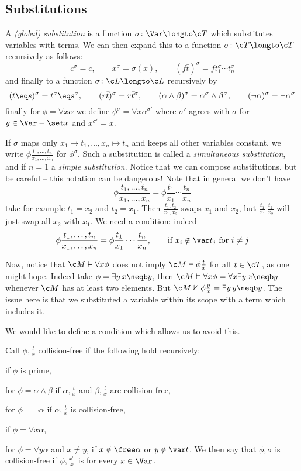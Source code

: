 \subsection{Substitutions}

A {\it (global) substitution} is a function $\sigma\colon\Var\longto\c T$ which substitutes variables with terms.
We can then expand this to a function $\sigma\colon\c T\longto\c T$ recursively as follows:
$$ c^\sigma = c,\qquad x^\sigma = \sigma(x),\qquad (f\bar t)^\sigma = ft_1^\sigma\cdots t_n^\sigma $$
and finally to a function $\sigma\colon\c L\longto\c L$ recursively by
$$ (t\eq s)^\sigma = t^\sigma\eq s^\sigma,\qquad (r\bar t)^\sigma = r\bar t^\sigma,\qquad (\alpha\land\beta)^\sigma = \alpha^\sigma\land\beta^\sigma,\qquad (\neg\alpha)^\sigma=\neg\alpha^\sigma $$
finally for $\phi=\forall x\alpha$ we define $\phi^\sigma=\forall x\alpha^{\sigma'}$ where $\sigma'$ agrees with $\sigma$ for $y\in\Var-\set x$ and $x^{\sigma'}=x$.


If $\sigma$ maps only $x_1\mapsto t_1,\dots,x_n\mapsto t_n$ and keeps all other variables constant, we write $\phi\frac{t_1,\dots,t_n}{x_1,\dots,x_n}$ for $\phi^\sigma$.
Such a substitution is called a {\it simultaneous substitution}, and if $n=1$ a {\it simple substitution}.
Notice that we can compose substitutions, but be careful -- this notation can be dangerous!
Note that in general we don't have
$$ \phi\frac{t_1,\dots,t_n}{x_1,\dots,x_n} = \phi\frac{t_1}{x_1}\cdots\frac{t_n}{x_n} $$
take for example $t_1=x_2$ and $t_2=x_1$.
Then $\frac{t_1,t_2}{x_1,x_2}$ swaps $x_1$ and $x_2$, but $\frac{t_1}{x_1}\,\frac{t_2}{x_2}$ will just swap all $x_2$ with $x_1$.
We need a condition: indeed
$$ \phi\frac{t_1,\dots,t_n}{x_1,\dots,x_n} = \phi\frac{t_1}{x_1}\cdots\frac{t_n}{x_n},\qquad \hbox{if $x_i\notin\var t_j$ for $i\neq j$} $$

Now, notice that $\c M\vDash\forall x\phi$ does not imply $\c M\vDash\phi\frac tx$ for all $t\in\c T$, as one might hope.
Indeed take $\phi=\exists y\,x\neqb y$, then $\c M\vDash\forall x\phi=\forall x\exists y\,x\neqb y$ whenever $\c M$ has at least two elements.
But $\c M\nvDash\phi\frac yx=\exists y\,y\neqb y$.
The issue here is that we substituted a variable within its scope with a term which includes it.

We would like to define a condition which allows us to avoid this.

\bdefn

    Call $\phi,\frac tx$ {\emphcolor collision-free} if the following hold recursively:
    \benum
        \item if $\phi$ is prime,
        \item for $\phi=\alpha\land\beta$ if $\alpha,\frac tx$ and $\beta,\frac tx$ are collision-free,
        \item for $\phi=\neg\alpha$ if $\alpha,\frac tx$ is collision-free,
        \item if $\phi=\forall x\alpha$,
        \item for $\phi=\forall y\alpha$ and $x\neq y$, if $x\notin\free\alpha$ or $y\notin\var t$.
    \eenum
    We then say that $\phi,\sigma$ is {\emphcolor collision-free} if $\phi,\frac{x^\sigma}x$ is for every $x\in\Var$.

